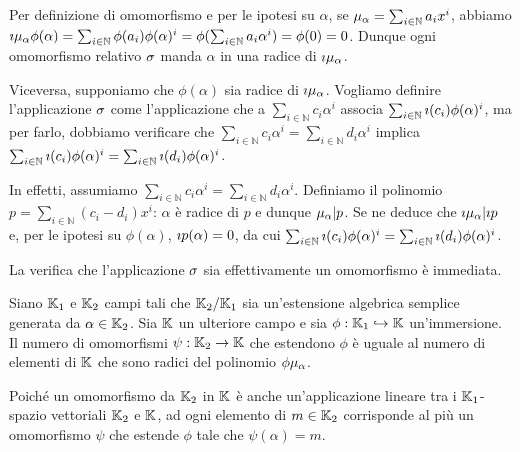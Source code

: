 \Proof Per definizione di omomorfismo e per le ipotesi su $\alpha$, se $\MinimalPolynomial{\alpha} = \sum_{i \in \mathbb{N}} a_i x^i$, abbiamo $\ImagePolynomial{\Immersion}{\MinimalPolynomial{\alpha}}{\phi(\alpha)} = \sum_{i \in \mathbb{N}} \phi(a_i) \phi(\alpha)^i = \phi(\sum_{i \in \mathbb{N}} a_i \alpha^i) = \phi(0) = 0$. Dunque ogni omomorfismo relativo $\sigma$ manda $\alpha$ in una radice di $\ImagePolynomial{\Immersion}{\MinimalPolynomial{\alpha}}$.
\par Viceversa, supponiamo che $\phi(\alpha)$ sia radice di $\ImagePolynomial{\Immersion}{\MinimalPolynomial{\alpha}}$. Vogliamo definire l'applicazione $\sigma$ come l'applicazione che a $\sum_{i \in \mathbb{N}} c_i \alpha^i$ associa $\sum_{i \in \mathbb{N}} \imath(c_i) \phi(\alpha)^i$, ma per farlo, dobbiamo verificare che $\sum_{i \in \mathbb{N}} c_i \alpha^i = \sum_{i \in \mathbb{N}} d_i \alpha^i$ implica $\sum_{i \in \mathbb{N}} \imath(c_i) \phi(\alpha)^i = \sum_{i \in \mathbb{N}} \imath(d_i) \phi(\alpha)^i$.
\par In effetti, assumiamo $\sum_{i \in \mathbb{N}} c_i \alpha^i = \sum_{i \in \mathbb{N}} d_i \alpha^i$. Definiamo il polinomio $p = \sum_{i \in \mathbb{N}} (c_i - d_i)x^i$: $\alpha$ \`e radice di $p$ e dunque $\MinimalPolynomial{\alpha}|p$. Se ne deduce che $\ImagePolynomial{\Immersion}{\MinimalPolynomial{\alpha}}|\ImagePolynomial{\Immersion}{p}$ e, per le ipotesi su $\phi(\alpha)$, ${\imath}{p}(\alpha) = 0$, da cui $\sum_{i \in \mathbb{N}} \imath(c_i) \phi(\alpha)^i = \sum_{i \in \mathbb{N}} \imath(d_i) \phi(\alpha)^i$.
\par La verifica che l'applicazione $\sigma$ sia effettivamente un omomorfismo \`e immediata. \EndProof
\begin{Corollary}\label{th_esistenzaomomorfismirelativi}
	Siano $\mathbb{K}_1$ e $\mathbb{K}_2$ campi tali che $\mathbb{K}_2/\mathbb{K}_1$ sia un'estensione algebrica semplice generata da $\alpha \in \mathbb{K}_2$. Sia $\mathbb{K}$ un ulteriore campo e sia $\phi: \mathbb{K}_1 \hookrightarrow \mathbb{K}$ un'immersione. Il numero di omomorfismi $\psi: \mathbb{K}_2 \rightarrow \mathbb{K}$ che estendono $\phi$ \`e uguale al numero di elementi di $\mathbb{K}$ che sono radici del polinomio $\ImagePolynomial{\phi}{\MinimalPolynomial{\alpha}}$.
\end{Corollary}
\Proof Poich\'e un omomorfismo da $\mathbb{K}_2$ in $\mathbb{K}$ \`e anche un'applicazione lineare tra i $\mathbb{K}_1$-spazio vettoriali $\mathbb{K}_2$ e $\mathbb{K}$, ad ogni elemento di $m \in \mathbb{K}_2$ corrisponde al pi\`u un omomorfismo $\psi$ che estende $\phi$ tale che $\psi(\alpha) = m$. \EndProof
